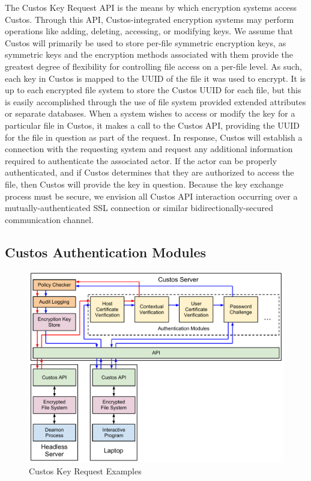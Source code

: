 The Custos Key Request API is the means by which encryption systems
access Custos. Through this API, Custos-integrated encryption systems
may perform operations like adding, deleting, accessing, or modifying
keys. We assume that Custos will primarily be used to store per-file
symmetric encryption keys, as symmetric keys and the encryption
methods associated with them provide the greatest degree of
flexibility for controlling file access on a per-file level. As such,
each key in Custos is mapped to the UUID of the file it was used to
encrypt. It is up to each encrypted file system to store the Custos
UUID for each file, but this is easily accomplished through the use of
file system provided extended attributes or separate databases. When a
system wishes to access or modify the key for a particular file in
Custos, it makes a call to the Custos API, providing the UUID for the
file in question as part of the request. In response, Custos will
establish a connection with the requesting system and request any
additional information required to authenticate the associated
actor. If the actor can be properly authenticated, and if Custos
determines that they are authorized to access the file, then Custos
will provide the key in question. Because the key exchange process
must be secure, we envision all Custos API interaction occurring over
a mutually-authenticated SSL connection or similar
bidirectionally-secured communication channel.

\subsection{Custos Authentication Modules}

\begin{figure}[!tb]
  \centering
  \includegraphics[width=\columnwidth]{./include/KeyRequest.pdf}
  \caption{Custos Key Request Examples}
  \label{fig:keyrequest}
\end{figure}


